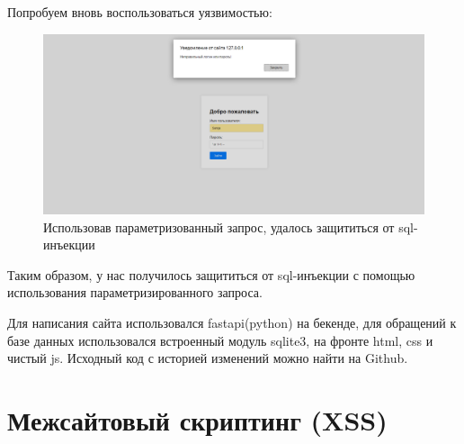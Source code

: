 \documentclass[a4paper,12pt]{diplom}
\begin{document}
	 Попробуем вновь воспользоваться уязвимостью:
	 
	 \begin{figure}[!ht]
	 	\centering
	 	\includegraphics[width=1\textwidth]{auth_sql_injection_defenced.png}
	 	\caption{Использовав параметризованный запрос, удалось защититься от sql-инъекции}
	 	\label{fig:auth_sql_injection_defenced}
	 \end{figure}
	 
	 
	 Таким образом, у нас получилось защититься от sql-инъекции с помощью использования параметризированного запроса.
	 
	 Для написания сайта использовался fastapi(python) на бекенде, для обращений к базе данных использовался встроенный модуль sqlite3, на фронте html, css и чистый js. Исходный код с историей изменений можно найти на Github.\cite{Github_chat_site_project}
	 
	 
	 
	 
	 
	 	
	 	
	 	
	 	
	 	
	 	
	 	
	 	
	 	
	 	
	 	
	 	
	 	
	 	
	 	
	 	
	 	
	 	
	 	
	 	
	 
	 
	 
	 
	 
	 
	 
	 
	 
	 
	 
	 
	 
	 
	 
	 
	 
	 
	 \chapter[Межсайтовый скриптинг (XSS)]{Межсайтовый скриптинг (XSS)}
	 
\end{document}
